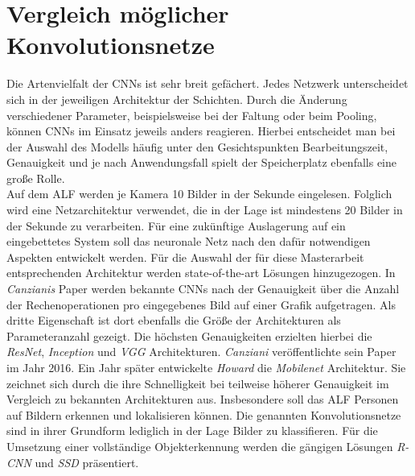 		\section{Vergleich möglicher Konvolutionsnetze}
		\label{sec: cnns}
		Die Artenvielfalt der CNNs ist sehr breit gefächert. Jedes Netzwerk unterscheidet sich in der jeweiligen Architektur der Schichten. Durch die Änderung verschiedener Parameter, beispielsweise bei der Faltung oder beim Pooling, können CNNs im Einsatz jeweils anders reagieren. Hierbei entscheidet man bei der Auswahl des Modells häufig unter den Gesichtspunkten Bearbeitungszeit, Genauigkeit und je nach Anwendungsfall spielt der Speicherplatz ebenfalls eine große Rolle.\\
		
		Auf dem ALF werden je Kamera 10 Bilder in der Sekunde eingelesen. Folglich wird eine Netzarchitektur verwendet, die in der Lage ist mindestens 20 Bilder in der Sekunde zu verarbeiten. Für eine zukünftige Auslagerung auf ein eingebettetes System soll das neuronale Netz nach den dafür notwendigen Aspekten entwickelt werden. Für die Auswahl der für diese Masterarbeit entsprechenden Architektur werden state-of-the-art Lösungen hinzugezogen. In \textit{Canzianis} Paper \cite{cnnvergleich} werden bekannte CNNs nach der Genauigkeit über die Anzahl der Rechenoperationen pro eingegebenes Bild auf einer Grafik aufgetragen. Als dritte Eigenschaft ist dort ebenfalls die Größe der Architekturen als Parameteranzahl gezeigt. Die höchsten Genauigkeiten erzielten hierbei die \textit{ResNet}, \textit{Inception} und \textit{VGG} Architekturen. \textit{Canziani} veröffentlichte sein Paper im Jahr 2016. Ein Jahr später entwickelte \textit{Howard} \cite{mobilenets} die \textit{Mobilenet} Architektur. Sie zeichnet sich durch die ihre Schnelligkeit bei teilweise höherer Genauigkeit im Vergleich zu bekannten Architekturen aus. Insbesondere soll das ALF Personen auf Bildern erkennen und lokalisieren können. Die genannten Konvolutionsnetze sind in ihrer Grundform lediglich in der Lage Bilder zu klassifieren. Für die Umsetzung einer vollständige Objekterkennung werden die gängigen Lösungen \textit{R-CNN} und \textit{SSD} präsentiert.\\
		
